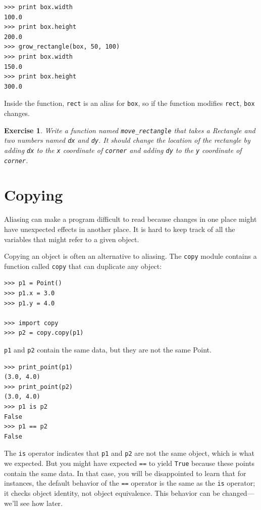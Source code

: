 \documentclass[12pt,a4paper,final,twoside,onecolumn,titlepage]{book}
\newtheorem{exercise}{Exercise}[chapter]
\begin{document}
\begin{verbatim}
>>> print box.width
100.0
>>> print box.height
200.0
>>> grow_rectangle(box, 50, 100)
>>> print box.width
150.0
>>> print box.height
300.0
\end{verbatim}
%
Inside the function, {\tt rect} is an
alias for {\tt box}, so if the function modifies {\tt rect}, 
{\tt box} changes.

\begin{exercise}

Write a function named \verb"move_rectangle" that takes
a Rectangle and two numbers named {\tt dx} and {\tt dy}.  It
should change the location of the rectangle by adding {\tt dx}
to the {\tt x} coordinate of {\tt corner} and adding {\tt dy}
to the {\tt y} coordinate of {\tt corner}.

\end{exercise}


\section{Copying}
\label{copying}

Aliasing can make a program difficult to read because changes
in one place might have unexpected effects in another place.
It is hard to keep track of all the variables that might refer
to a given object.

Copying an object is often an alternative to aliasing.
The {\tt copy} module contains a function called {\tt copy} that
can duplicate any object:

\begin{verbatim}
>>> p1 = Point()
>>> p1.x = 3.0
>>> p1.y = 4.0

>>> import copy
>>> p2 = copy.copy(p1)
\end{verbatim}
%
{\tt p1} and {\tt p2} contain the same data, but they are
not the same Point.

\begin{verbatim}
>>> print_point(p1)
(3.0, 4.0)
>>> print_point(p2)
(3.0, 4.0)
>>> p1 is p2
False
>>> p1 == p2
False
\end{verbatim}
%
The {\tt is} operator indicates that {\tt p1} and {\tt p2} are not the
same object, which is what we expected.  But you might have expected
{\tt ==} to yield {\tt True} because these points contain the same
data.  In that case, you will be disappointed to learn that for
instances, the default behavior of the {\tt ==} operator is the same
as the {\tt is} operator; it checks object identity, not object
equivalence.  This behavior can be changed---we'll see how later.
\end{document}
